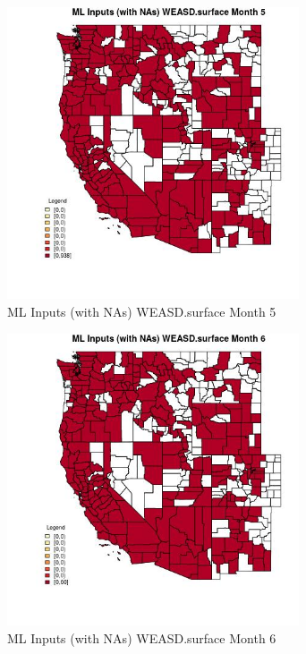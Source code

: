 \clearpage 

\begin{figure} 
\centering  
\includegraphics[width=0.77\textwidth]{Code_Outputs/Report_ML_input_PM25_Step4_part_e_de_duplicated_aves_compiled_2019-05-21wNAs_CountyWEASDsurfacemedianMonth5.jpg} 
\caption{\label{fig:Report_ML_input_PM25_Step4_part_e_de_duplicated_aves_compiled_2019-05-21wNAsCountyWEASDsurfacemedianMonth5}ML Inputs (with NAs) WEASD.surface Month 5} 
\end{figure} 
 

\begin{figure} 
\centering  
\includegraphics[width=0.77\textwidth]{Code_Outputs/Report_ML_input_PM25_Step4_part_e_de_duplicated_aves_compiled_2019-05-21wNAs_CountyWEASDsurfacemedianMonth6.jpg} 
\caption{\label{fig:Report_ML_input_PM25_Step4_part_e_de_duplicated_aves_compiled_2019-05-21wNAsCountyWEASDsurfacemedianMonth6}ML Inputs (with NAs) WEASD.surface Month 6} 
\end{figure} 
 

